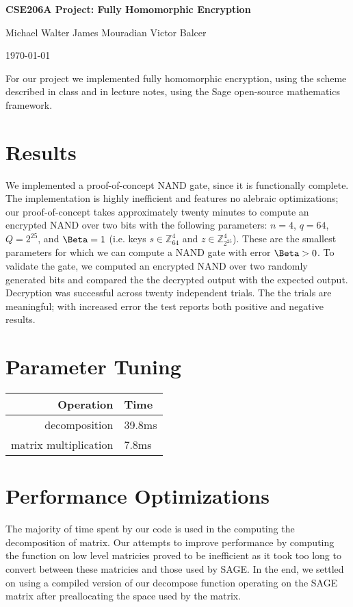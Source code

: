 \documentclass{article}
\begin{document}
\centerline{\LARGE{\bf{CSE206A Project: Fully Homomorphic Encryption}}}
\vspace{12.0pt}
\centerline{Michael Walter \hspace{0.1in} James Mouradian \hspace{0.1in} Victor Balcer}
\vspace{4.0pt}
\centerline{\today}

For our project we implemented fully homomorphic encryption, using the scheme
described in class and in lecture notes, using the Sage open-source mathematics
framework.

\section{Results}

We implemented a proof-of-concept NAND gate, since it is functionally complete.
The implementation is highly inefficient and features no alebraic
optimizations; our proof-of-concept takes approximately twenty minutes to
compute an encrypted NAND over two bits with the following parameters: $n=4$,
$q=64$, $Q=2^{25}$, and $\Beta=1$ (i.e. keys $s\in \mathbb{Z}_{64}^4$ and
$z\in\mathbb{Z}_{2^{25}}^4$). These are the smallest parameters for which we
can compute a NAND gate with error $\Beta > 0$. To validate the gate, we
computed an encrypted NAND over two randomly generated bits and compared the
the decrypted output with the expected output. Decryption was successful across
twenty independent trials. The the trials are meaningful; with increased error
the test reports both positive and negative results.

\section{Parameter Tuning}


\begin{tabular}{r   l}
\textbf{Operation} & \textbf{Time} \\
\hline
decomposition & 39.8ms \\
matrix multiplication & 7.8ms \\
\end{tabular}


\section{Performance Optimizations}
The majority of time spent by our code is used in the computing the decomposition of
matrix. Our attempts to improve performance by computing the function on low level
matricies proved to be inefficient as it took too long to convert between these
matricies and those used by SAGE. In the end, we settled on using a compiled version
of our decompose function operating on the SAGE matrix after preallocating the space
used by the matrix.
\end{document}
